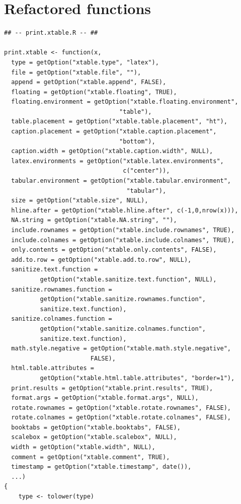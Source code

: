 \documentclass{memoir}\usepackage[]{graphicx}\usepackage[]{color}
\begin{document}
\chapter{Refactored functions}



\begin{lstlisting}
## -- print.xtable.R -- ##

print.xtable <- function(x,
  type = getOption("xtable.type", "latex"),
  file = getOption("xtable.file", ""),
  append = getOption("xtable.append", FALSE),
  floating = getOption("xtable.floating", TRUE),
  floating.environment = getOption("xtable.floating.environment", 
                                "table"),
  table.placement = getOption("xtable.table.placement", "ht"),
  caption.placement = getOption("xtable.caption.placement", 
                                "bottom"),
  caption.width = getOption("xtable.caption.width", NULL),
  latex.environments = getOption("xtable.latex.environments", 
                                 c("center")),
  tabular.environment = getOption("xtable.tabular.environment", 
                                  "tabular"),
  size = getOption("xtable.size", NULL),
  hline.after = getOption("xtable.hline.after", c(-1,0,nrow(x))),
  NA.string = getOption("xtable.NA.string", ""),
  include.rownames = getOption("xtable.include.rownames", TRUE),
  include.colnames = getOption("xtable.include.colnames", TRUE),
  only.contents = getOption("xtable.only.contents", FALSE),
  add.to.row = getOption("xtable.add.to.row", NULL),
  sanitize.text.function = 
          getOption("xtable.sanitize.text.function", NULL),
  sanitize.rownames.function = 
          getOption("xtable.sanitize.rownames.function",
          sanitize.text.function),
  sanitize.colnames.function = 
          getOption("xtable.sanitize.colnames.function",
          sanitize.text.function),
  math.style.negative = getOption("xtable.math.style.negative", 
                        FALSE),
  html.table.attributes = 
          getOption("xtable.html.table.attributes", "border=1"),
  print.results = getOption("xtable.print.results", TRUE),
  format.args = getOption("xtable.format.args", NULL),
  rotate.rownames = getOption("xtable.rotate.rownames", FALSE),
  rotate.colnames = getOption("xtable.rotate.colnames", FALSE),
  booktabs = getOption("xtable.booktabs", FALSE),
  scalebox = getOption("xtable.scalebox", NULL),
  width = getOption("xtable.width", NULL),
  comment = getOption("xtable.comment", TRUE),
  timestamp = getOption("xtable.timestamp", date()),
  ...)
{
    type <- tolower(type)


\end{lstlisting}
\end{document}

